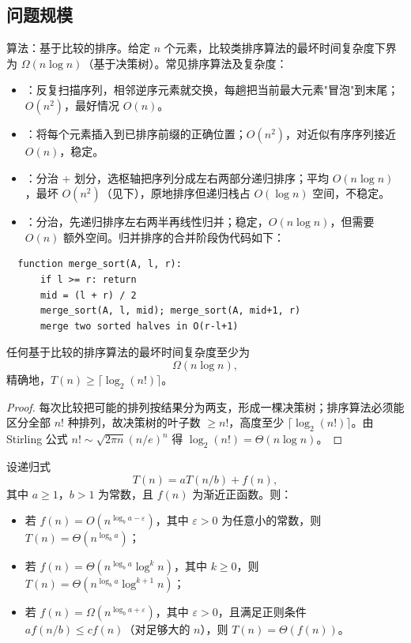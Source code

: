 \documentclass[12pt]{article}
\begin{document}
\subsection{问题规模}
\begin{exam}
  算法：基于比较的排序。给定 $n$ 个元素，比较类排序算法的最坏时间复杂度下界为 $\Omega(n\log n)$（基于决策树）。常见排序算法及复杂度：
  \begin{itemize}
    \item {}：反复扫描序列，相邻逆序元素就交换，每趟把当前最大元素"冒泡"到末尾；$O(n^2)$，最好情况 $O(n)$。
    \item {}：将每个元素插入到已排序前缀的正确位置；$O(n^2)$，对近似有序序列接近 $O(n)$，稳定。
    \item {}：分治 + 划分，选枢轴把序列分成左右两部分递归排序；平均 $O(n\log n)$，最坏 $O(n^2)$（见下），原地排序但递归栈占 $O(\log n)$ 空间，不稳定。
    \item {}：分治，先递归排序左右两半再线性归并；稳定，$O(n\log n)$，但需要 $O(n)$ 额外空间。归并排序的合并阶段伪代码如下：
  \end{itemize}
  \begin{verbatim}
  function merge_sort(A, l, r):
      if l >= r: return
      mid = (l + r) / 2
      merge_sort(A, l, mid); merge_sort(A, mid+1, r)
      merge two sorted halves in O(r-l+1)
  \end{verbatim}
\end{exam}
\begin{thm}[比较排序下界]
  任何基于比较的排序算法的最坏时间复杂度至少为
  \[
    \Omega(n\log n),
  \]
  精确地，$T(n) \ge \lceil\log_2(n!)\rceil$。
\end{thm}
\begin{proof}
  每次比较把可能的排列按结果分为两支，形成一棵决策树；排序算法必须能区分全部 $n!$ 种排列，故决策树的叶子数 $\ge n!$，高度至少 $\lceil\log_2(n!)\rceil$。由 Stirling 公式 $n!\sim\sqrt{2\pi n}(n/e)^n$ 得 $\log_2(n!)=\Theta(n\log n)$。
\end{proof}
\begin{thm}
  设递归式
  \[
    T(n)=aT(n/b)+f(n),
  \]
  其中 $a\ge 1$，$b>1$ 为常数，且 $f(n)$ 为渐近正函数。则：
  \begin{itemize}
    \item 若 $f(n)=O(n^{\log_b a-\varepsilon})$，其中 $\varepsilon>0$ 为任意小的常数，则 $T(n)=\Theta(n^{\log_b a})$；
    \item 若 $f(n)=\Theta(n^{\log_b a}\log^k n)$，其中 $k\ge 0$，则 $T(n)=\Theta(n^{\log_b a}\log^{k+1} n)$；
    \item 若 $f(n)=\Omega(n^{\log_b a+\varepsilon})$，其中 $\varepsilon>0$，且满足正则条件 $a f(n/b)\le c f(n)$（对足够大的 $n$），则 $T(n)=\Theta(f(n))$。
  \end{itemize}
\end{thm}
\end{document}
